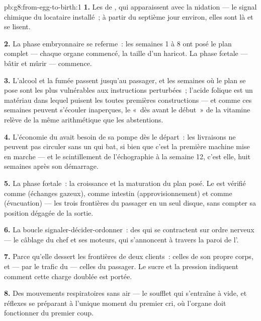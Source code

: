 \begin{solution}{pb:g8:from-egg-to-birth:1}
\textbf{1.} Les  de , qui apparaissent avec la
nidation --- le signal chimique du locataire installé~; à partir du
septième jour environ, elles sont là et se lisent.

\textbf{2.} La phase embryonnaire se referme~: les semaines 1 à 8
ont posé le plan complet --- chaque organe commencé, la taille d'un
haricot. La phase fœtale --- bâtir et mûrir --- commence.

\textbf{3.} L'alcool et la fumée passent jusqu'au passager, et les
semaines où le plan se pose sont les plus vulnérables aux
instructions perturbées~; l'acide folique est un matériau dans
lequel puisent les toutes premières constructions --- et comme ces
semaines peuvent s'écouler inaperçues, le «~dès avant le début~» de
la vitamine relève de la même arithmétique que les abstentions.

\textbf{4.} L'économie du  avait besoin de sa pompe dès le
départ~: les livraisons ne peuvent pas circuler sans un  qui
bat, si bien que c'est la première machine mise en marche --- et le
scintillement de l'échographie à la semaine 12, c'est elle, huit
semaines après son démarrage.

\textbf{5.} La phase fœtale~: la croissance et la maturation du plan
posé. Le  est vérifié comme  (échanges gazeux), comme
intestin (approvisionnement) et comme  (évacuation) --- les
trois frontières du passager en un seul disque, sans compter sa
position dégagée de la sortie.

\textbf{6.} La boucle signaler-décider-ordonner~: des  qui se
contractent sur ordre nerveux --- le câblage du chef et ses moteurs,
qui s'annoncent à travers la paroi de l'.

\textbf{7.} Parce qu'elle dessert les frontières de deux clients~:
celles de son propre corps, et --- par le trafic du  ---
celles du passager. Le sucre et la pression indiquent comment cette
charge doublée est portée.

\textbf{8.} Des mouvements respiratoires sans air --- le soufflet
qui s'entraîne à vide,  et réflexes se préparant à l'unique
moment du premier cri, où l'organe doit fonctionner du premier
coup.


\end{solution}
